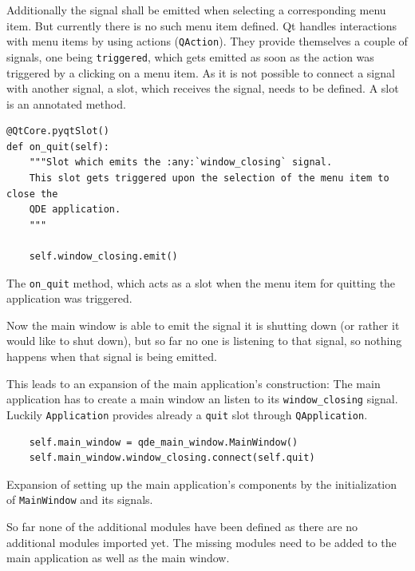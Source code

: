 \documentclass[10pt, openright, notitlepage]{scrreprt}
\begin{document}
Additionally the signal shall be emitted when selecting a corresponding menu
item. But currently there is no such menu item defined. Qt handles interactions
with menu items by using actions (\texttt{QAction}). They provide themselves a couple
of signals, one being \texttt{triggered}, which gets emitted as soon as the action was
triggered by a clicking on a menu item. As it is not possible to connect a
signal with another signal, a slot, which receives the signal, needs to be
defined. A slot is an annotated method.

\begin{listing}[H]
\begin{verbatim}
@QtCore.pyqtSlot()
def on_quit(self):
    """Slot which emits the :any:`window_closing` signal.
    This slot gets triggered upon the selection of the menu item to close the
    QDE application.
    """

    self.window_closing.emit()
\end{verbatim}
\caption{\label{main-window-slots}
The \texttt{on\_quit} method, which acts as a slot when the menu item for quitting the application was triggered.}
\end{listing}

Now the main window is able to emit the signal it is shutting down (or
rather it would like to shut down), but so far no one is listening to that
signal, so nothing happens when that signal is being emitted.

This leads to an expansion of the main application's construction: The main
application has to create a main window an listen to its \texttt{window\_closing}
signal. Luckily \texttt{Application} provides already a \texttt{quit} slot through
\texttt{QApplication}.

\begin{listing}[H]
\begin{verbatim}
    self.main_window = qde_main_window.MainWindow()
    self.main_window.window_closing.connect(self.quit)
\end{verbatim}
\caption{\label{app-setup-components}
Expansion of setting up the main application's components by the initialization of \texttt{MainWindow} and its signals.}
\end{listing}

So far none of the additional modules have been defined as there are no
additional modules imported yet. The missing modules need to be added to the
main application as well as the main window.
\end{document}
